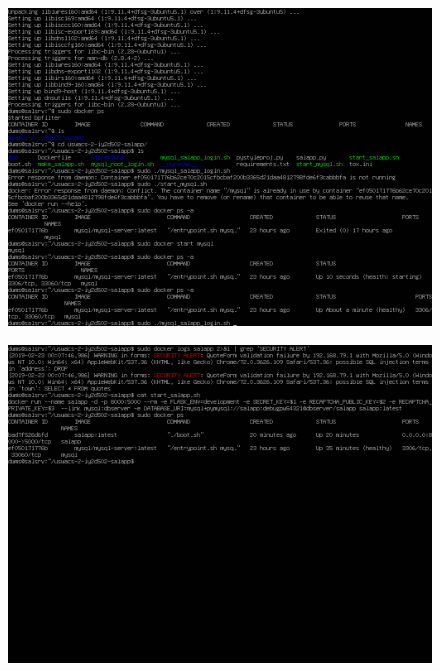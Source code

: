 \begin{figure}[h!]
\centering
\captionsetup{skip=\skipfigurecaptionlen}
\includegraphics[width=1\textwidth]{screenshots/IY2D502-2019-02-22-23-49-29.png}
\caption{}
\label{fig:IY2D502-2019-02-22-23-49-29}
\end{figure}
\pagebreak
\begin{figure}[h!]
\centering
\captionsetup{skip=\skipfigurecaptionlen}
\includegraphics[width=1\textwidth]{screenshots/IY2D502-2019-02-23-00-23-12.png}
\caption{}
\label{fig:IY2D502-2019-02-23-00-23-12}
\end{figure}
\pagebreak
